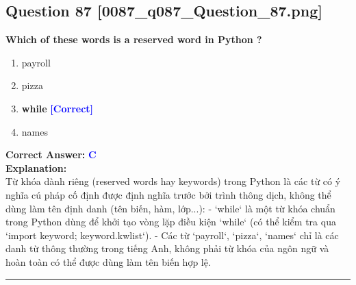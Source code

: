 \documentclass[11pt,a4paper]{article}
\begin{document}
\begin{minipage}{\textwidth}
\subsection*{Question 87 \quad \footnotesize{[0087_q087_Question_87.png]}}
\noindent \textbf{Which of these words is a reserved word in Python ?}

\begin{enumerate}[label=\Alph*.]
    \item payroll
    \item pizza
    \item \textbf{while} \hfill \textcolor{blue}{\textbf{[Correct]}}
    \item names
\end{enumerate}

\noindent \textbf{Correct Answer:} \textcolor{blue}{\textbf{C}} \\[4pt]
\noindent \textbf{Explanation:}\\
Từ khóa dành riêng (reserved words hay keywords) trong Python là các từ có ý nghĩa cú pháp cố định được định nghĩa trước bởi trình thông dịch, không thể dùng làm tên định danh (tên biến, hàm, lớp...):\newline
- `while` là một từ khóa chuẩn trong Python dùng để khởi tạo vòng lặp điều kiện `while` (có thể kiểm tra qua `import keyword; keyword.kwlist`).\newline
- Các từ `payroll`, `pizza`, `names` chỉ là các danh từ thông thường trong tiếng Anh, không phải từ khóa của ngôn ngữ và hoàn toàn có thể được dùng làm tên biến hợp lệ.
\end{minipage}
\vspace{0.8cm}
\hrule
\vspace{0.5cm}
\end{document}
